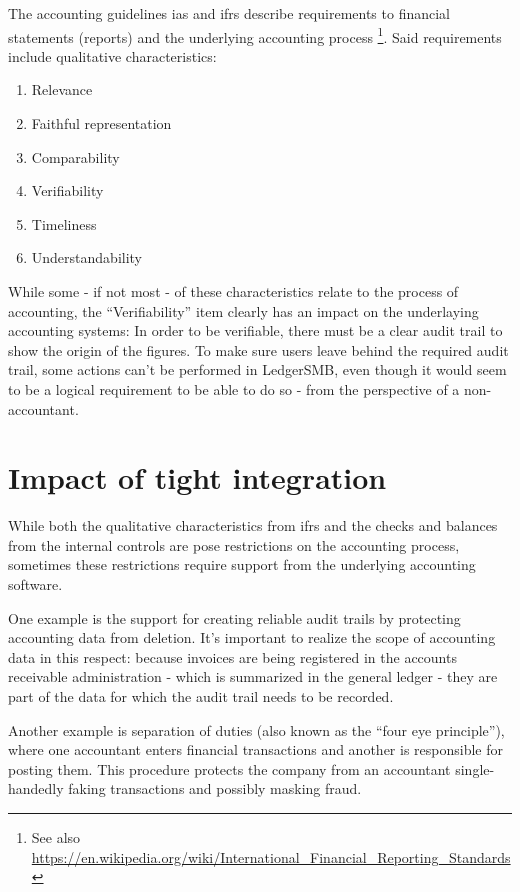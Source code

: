 The accounting guidelines \gls{ias} and \gls{ifrs} describe requirements
to financial statements (reports) and the underlying accounting process
\footnote{See also \url{https://en.wikipedia.org/wiki/International_Financial_Reporting_Standards}}.
Said requirements include qualitative characteristics:

\begin{enumerate}
\item Relevance
\item Faithful representation
\item Comparability
\item Verifiability
\item Timeliness
\item Understandability
\end{enumerate}

While some - if not most - of these characteristics relate to the process of accounting,
the ``Verifiability'' item clearly has an impact on the underlaying accounting systems:
In order to be verifiable, there must be a clear audit trail to show the origin of the
figures. To make sure users leave behind the required audit trail, some actions can't
be performed in LedgerSMB, even though it would seem to be a logical requirement to be
able to do so - from the perspective of a non-accountant.


\section{Impact of tight integration}
\label{sec-system-impact-of-tight-integration}

While both the qualitative characteristics from \gls{ifrs} and the checks and balances
from the internal controls are pose restrictions on the accounting process,
sometimes these restrictions require support from the underlying accounting
software.

One example is the support for creating reliable audit trails
by protecting accounting data from deletion. It's important to realize the scope
of accounting data in this respect: because invoices are being registered in the
accounts receivable administration - which is summarized in the general ledger -
they are part of the data for which the audit trail needs to be recorded.

Another example is separation of duties (also known as the ``four eye principle''),
where one accountant enters financial transactions and another is responsible for
posting them. This procedure protects the company from an accountant single-handedly
faking transactions and possibly masking fraud.

